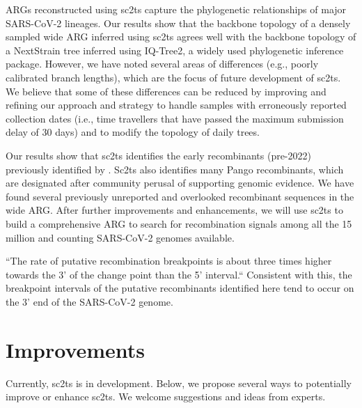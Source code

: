 \documentclass{article}
\begin{document}
ARGs reconstructed using sc2ts capture the phylogenetic relationships of major SARS-CoV-2 lineages. Our results show that the backbone topology of a densely sampled wide ARG inferred using sc2ts agrees well with the backbone topology of a NextStrain tree inferred using IQ-Tree2, a widely used phylogenetic inference package. However, we have noted several areas of differences (e.g., poorly calibrated branch lengths), which are the focus of future development of sc2ts. We believe that some of these differences can be reduced by improving and refining our approach and strategy to handle samples with erroneously reported collection dates (i.e., time travellers that have passed the maximum submission delay of 30 days) and to modify the topology of daily trees.

Our results show that sc2ts identifies the early recombinants (pre-2022) previously identified by \cite{Jackson2021-ik}. Sc2ts also identifies many Pango recombinants, which are designated after community perusal of supporting genomic evidence. We have found several previously unreported and overlooked recombinant sequences in the wide ARG. After further improvements and enhancements, we will use sc2ts to build a comprehensive ARG to search for recombination signals among all the 15 million and counting SARS-CoV-2 genomes available.

``The rate of putative recombination breakpoints is about three times higher towards the 3' of the change point than the 5' interval.`` Consistent with this, the breakpoint intervals of the putative recombinants identified here tend to occur on the 3’ end of the SARS-CoV-2 genome.

\section{Improvements}
Currently, sc2ts is in development. Below, we propose several ways to potentially improve or enhance sc2ts. We welcome suggestions and ideas from experts.
\end{document}
